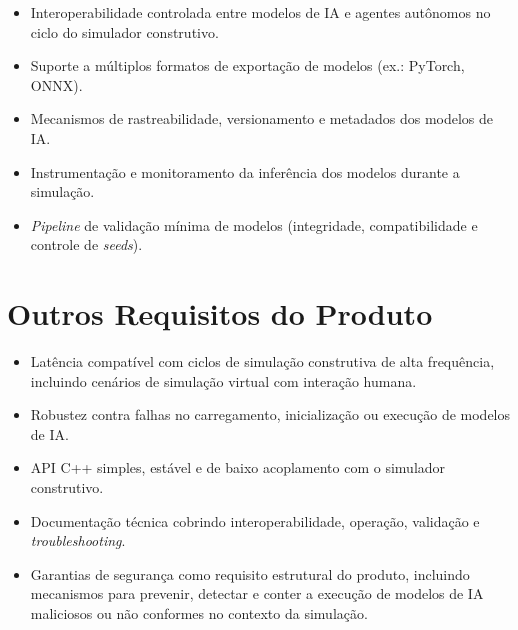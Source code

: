 \begin{itemize}
    \item Interoperabilidade controlada entre modelos de IA e agentes autônomos no ciclo do simulador construtivo.
    \item Suporte a múltiplos formatos de exportação de modelos (ex.: PyTorch, ONNX).
    \item Mecanismos de rastreabilidade, versionamento e metadados dos modelos de IA.
    \item Instrumentação e monitoramento da inferência dos modelos durante a simulação.
    \item \emph{Pipeline} de validação mínima de modelos (integridade, compatibilidade e controle de \emph{seeds}).
\end{itemize}

\section{Outros Requisitos do Produto}

\begin{itemize}
    \item Latência compatível com ciclos de simulação construtiva de alta frequência, incluindo cenários de simulação virtual com interação humana.
    \item Robustez contra falhas no carregamento, inicialização ou execução de modelos de IA.
    \item API C++ simples, estável e de baixo acoplamento com o simulador construtivo.
    \item Documentação técnica cobrindo interoperabilidade, operação, validação e \emph{troubleshooting}.
    \item Garantias de segurança como requisito estrutural do produto, incluindo mecanismos para prevenir, detectar e conter a execução de modelos de IA maliciosos ou não conformes no contexto da simulação.
\end{itemize}

